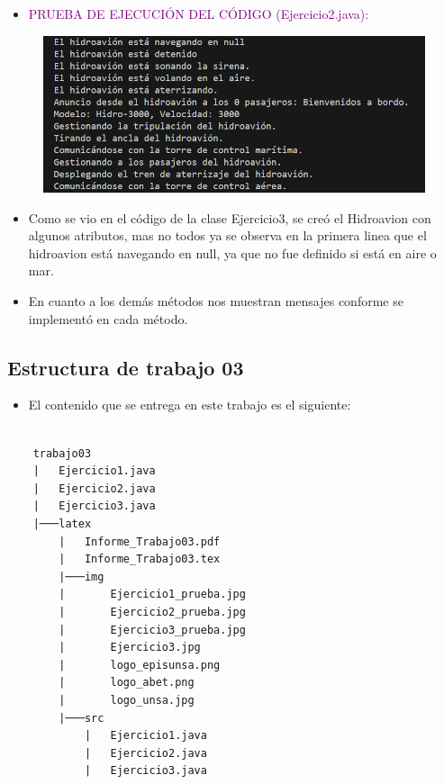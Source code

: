 \documentclass{article}
\newcommand{\itemPracticeNumber}{03}
\begin{document}
    \begin{itemize}
        \item \textcolor{purple}{PRUEBA DE EJECUCIÓN DEL CÓDIGO (Ejercicio2.java):}
    \end{itemize}
    \begin{figure}[H]
        \centering
        \includegraphics[width=1
        \textwidth,keepaspectratio]{img/Ejercicio3_prueba.png}
    \end{figure}

    \begin{itemize}
        \item Como se vio en el código de la clase Ejercicio3, se creó el Hidroavion con algunos atributos, mas no todos ya se observa en la primera linea que el hidroavion está navegando en null, ya que no fue definido si está en aire o mar.
        \item En cuanto a los demás métodos nos muestran mensajes conforme se implementó en cada método.
    \end{itemize}


\newpage

\subsection{Estructura de trabajo \itemPracticeNumber} %
\begin{itemize}	
	\item El contenido que se entrega en este trabajo es el siguiente:
\end{itemize}


\begin{lstlisting}[style=ascii-tree]

    trabajo03
    |   Ejercicio1.java
    |   Ejercicio2.java
    |   Ejercicio3.java
    |───latex
        |   Informe_Trabajo03.pdf
        |   Informe_Trabajo03.tex
        |───img 
        |       Ejercicio1_prueba.jpg  
        |       Ejercicio2_prueba.jpg  
        |       Ejercicio3_prueba.jpg  
        |       Ejercicio3.jpg  
        |       logo_episunsa.png  
        |       logo_abet.png      
        |       logo_unsa.jpg      
        |───src
            |   Ejercicio1.java
            |   Ejercicio2.java
            |   Ejercicio3.java
            

\end{lstlisting}    
\end{document}
